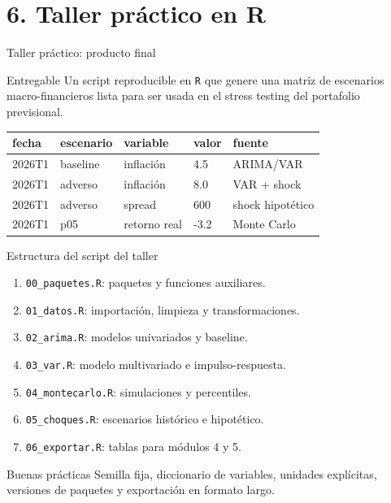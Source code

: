 \documentclass[10pt,aspectratio=169]{beamer}
\newcommand{\R}{\texttt{R}}
\begin{document}
\section{6. Taller práctico en R}

\begin{frame}{Taller práctico: producto final}
\begin{block}{Entregable}
Un script reproducible en \R{} que genere una matriz de escenarios macro-financieros lista para ser usada en el stress testing del portafolio previsional.
\end{block}

\begin{table}
\small
\begin{tabular}{lllll}
\toprule
fecha & escenario & variable & valor & fuente \\
\midrule
2026T1 & baseline & inflación & 4.5 & ARIMA/VAR \\
2026T1 & adverso & inflación & 8.0 & VAR + shock \\
2026T1 & adverso & spread & 600 & shock hipotético \\
2026T1 & p05 & retorno real & -3.2 & Monte Carlo \\
\bottomrule
\end{tabular}
\end{table}
\end{frame}

\begin{frame}{Estructura del script del taller}
\begin{enumerate}
  \item \texttt{00\_paquetes.R}: paquetes y funciones auxiliares.
  \item \texttt{01\_datos.R}: importación, limpieza y transformaciones.
  \item \texttt{02\_arima.R}: modelos univariados y baseline.
  \item \texttt{03\_var.R}: modelo multivariado e impulso-respuesta.
  \item \texttt{04\_montecarlo.R}: simulaciones y percentiles.
  \item \texttt{05\_choques.R}: escenarios histórico e hipotético.
  \item \texttt{06\_exportar.R}: tablas para módulos 4 y 5.
\end{enumerate}

\vspace{0.5em}
\begin{block}{Buenas prácticas}
Semilla fija, diccionario de variables, unidades explícitas, versiones de paquetes y exportación en formato largo.
\end{block}
\end{frame}
\end{document}
